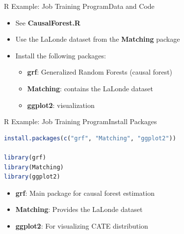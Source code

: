 \documentclass[hyperref={pdfpagelabels=false}]{beamer}
\begin{document}
\begin{frame}[fragile]{R Example: Job Training Program}{Data and Code}
	\begin{itemize}
		\item See \textbf{CausalForest.R}
		\vspace{0.2cm}
		\item Use the LaLonde dataset from the \textbf{Matching} package
		\vspace{0.2cm}
		\item Install the following packages:
		\begin{itemize}
			\vspace{0.2cm}
			\item \textbf{grf}: Generalized Random Forests (causal forest)
			\vspace{0.2cm}
			\item \textbf{Matching}: contains the LaLonde dataset
			\vspace{0.2cm}
			\item \textbf{ggplot2}: visualization
		\end{itemize}
	\end{itemize}
\end{frame}




\begin{frame}[fragile]{R Example: Job Training Program}{Install Packages}
\begin{lstlisting}[language=R]
install.packages(c("grf", "Matching", "ggplot2"))

library(grf)
library(Matching)
library(ggplot2)
\end{lstlisting}
	\begin{itemize}
		\item \textbf{grf}: Main package for causal forest estimation
		\vspace{0.2cm}
		\item \textbf{Matching}: Provides the LaLonde dataset
		\vspace{0.2cm}
		\item \textbf{ggplot2}: For visualizing CATE distribution
	\end{itemize}
\end{frame}
\end{document}
